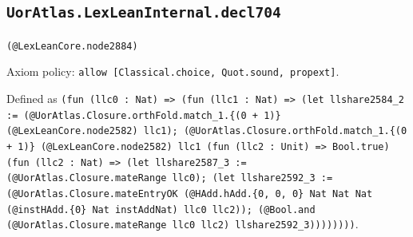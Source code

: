 \documentclass[11pt]{article}
\begin{document}
\subsection*{\texttt{UorAtlas.LexLeanInternal.decl704}}
\noindent\texttt{(@LexLeanCore.node2884)}\par
\noindent Axiom policy: \texttt{allow [Classical.choice, Quot.sound, propext]}.\par
\noindent Defined as \texttt{(fun (llc0 : Nat) => (fun (llc1 : Nat) => (let llshare2584\_2 := (@UorAtlas.Closure.orthFold.match\_1.\{(0 + 1)\} (@LexLeanCore.node2582) llc1); (@UorAtlas.Closure.orthFold.match\_1.\{(0 + 1)\} (@LexLeanCore.node2582) llc1 (fun (llc2 : Unit) => Bool.true) (fun (llc2 : Nat) => (let llshare2587\_3 := (@UorAtlas.Closure.mateRange llc0); (let llshare2592\_3 := (@UorAtlas.Closure.mateEntryOK (@HAdd.hAdd.\{0, 0, 0\} Nat Nat Nat (@instHAdd.\{0\} Nat instAddNat) llc0 llc2)); (@Bool.and (@UorAtlas.Closure.mateRange llc0 llc2) llshare2592\_3))))))))}.\par
\end{document}
